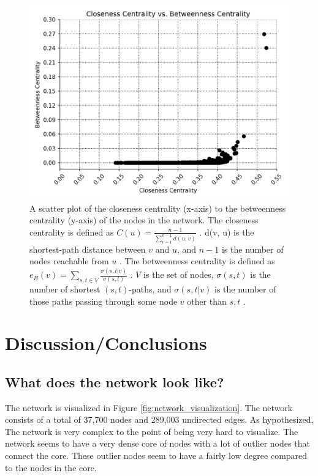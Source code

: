 \documentclass[9pt,twocolumn,twoside]{pnas-new}
\begin{document}
\begin{figure}
\centering
\includegraphics[width=.8\linewidth]{centralities}
\caption{A scatter plot of the closeness centrality (x-axis) to the betweenness centrality (y-axis) of the nodes in the network. The closeness centrality is defined as $C(u) =\frac{n-1}{\sum_{v=1}^{n-1}d(u, v)}$ \cite{networkxclosenesscentrality}. d(v, u) is the shortest-path distance between $v$ and $u$, and $n-1$ is the number of nodes reachable from $u$ \cite{networkxclosenesscentrality}. The betweenness centrality is defined as $e_{B}(v)=\sum_{s,t\in V}^{}\frac{\sigma(s, t|v)}{\sigma(s, t)}$ \cite{networkxbetweennesscentrality}. $V$ is the set of nodes, $\sigma(s, t)$ is the number of shortest $(s, t)$-paths, and $\sigma(s, t|v)$ is the number of those paths passing through some node $v$ other than $s, t$ \cite{networkxbetweennesscentrality}.
}
\label{fig:centralities}
\end{figure}

\section{Discussion/Conclusions}

\subsection{What does the network look like?}

The network is visualized in Figure \ref{fig:network_visualization}. The network consists of a total of 37,700 nodes and 289,003 undirected edges. As hypothesized, The network is very complex to the point of being very hard to visualize. The network seems to have a very dense core of nodes with a lot of outlier nodes that connect the core. These outlier nodes seem to have a fairly low degree compared to the nodes in the core.
\end{document}
